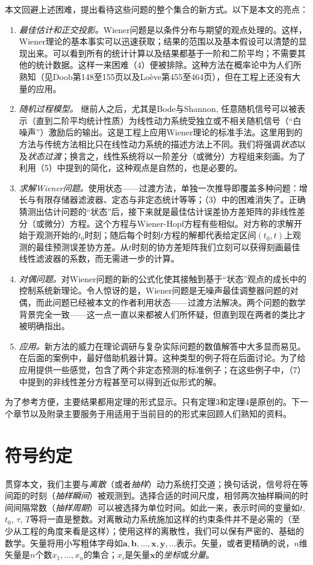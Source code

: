 \documentclass[UTF8,adobefonts]{ctexart}
\begin{document}
本文回避上述困难，提出看待这些问题的整个集合的新方式。以下是本文的亮点：
\begin{enumerate}[resume]
\item \emph{最佳估计和正交投影。}Wiener问题是以条件分布与期望的观点处理的。这样，Wiener理论的基本事实可以迅速获取；结果的范围以及基本假设可以清楚的显现出来。可以看到所有的统计计算以及结果都基于一阶和二阶平均；不需要其他的统计数据。这样一来困难（4）便被排除。这种方法在概率论中为人们所熟知（见Doob\cite{rf15}第148至155页以及Lo\`eve\cite{rf16}第455至464页），但在工程上还没有大量的应用。
\item \emph{随机过程模型。} 继前人之后，尤其是Bode与Shannon\cite{rf3}, 任意随机信号可以被表示（直到二阶平均统计性质）为线性动力系统受独立或不相关随机信号（“白噪声”）激励后的输出。这是工程上应用Wiener理论的标准手法\cite{rf2,rf3,rf4,rf5,rf6,rf7}。这里用到的方法与传统方法相比只在线性动力系统的描述方法上不同。我们将强调\emph{状态}以及\emph{状态过渡}；换言之，线性系统将以一阶差分（或微分）方程组来刻画。为了利用（5）中提到的简化，这种观点是自然的，也是必要的。
\item \emph{求解Wiener问题。}使用状态——过渡方法，单独一次推导即覆盖多种问题：增长与有限存储器滤波器、定态与非定态统计等等；（3）中的困难消失了。正确猜测出估计问题的“状态”后，接下来就是最佳估计误差协方差矩阵的非线性差分（或微分）方程。这个方程与Wiener-Hopf方程有些相似。对方称的求解开始于观测开始的$t_0$时刻；随后每个时刻$t$方程的解都代表给定区间$(t_0, t)$上观测的最佳预测误差协方差。从$t$时刻的协方差矩阵我们立刻可以获得刻画最佳线性滤波器的系数，而无需进一步的计算。
\item \emph{对偶问题。}对Wiener问题的新的公式化使其接触到基于“状态”观点的成长中的控制系统新理论\cite{rf17,rf18,rf19,rf20,rf21,rf22,rf23,rf24}。令人惊讶的是，Wiener问题是无噪声最佳调整器问题的对偶，而此问题已经被本文的作者利用状态——过渡方法解决\cite{rf18,rf23,rf24}。两个问题的数学背景完全一致——这一点一直以来都被人们所怀疑，但直到现在两者的类比才被明确指出。
\item \emph{应用。}新方法的威力在理论调研与复杂实际问题的数值解答中大多显而易见。在后面的案例中，最好借助机器计算。这种类型的例子将在后面讨论。为了给应用提供一些感觉，包含了两个非定态预测的标准例子；在这些例子中，（7）中提到的非线性差分方程甚至可以得到近似形式的解。
\end{enumerate}

为了参考方便，主要结果都用定理的形式显示。只有定理3和定理4是原创的。下一个章节以及附录主要服务于用适用于当前目的的形式来回顾人们熟知的资料。

\section{符号约定}
贯穿本文，我们主要与\emph{离散}（或者\emph{抽样}）动力系统打交道；换句话说，信号将在等间距的时刻（\emph{抽样瞬间}）被观测到。选择合适的时间尺度，相邻两次抽样瞬间的时间间隔常数（\emph{抽样周期}）可以被选择为单位时间。如此一来，表示时间的变量如$t$, $t_0$, $\tau$, $T$等将一直是整数。对离散动力系统施加这样的约束条件并不是必需的（至少从工程的角度来看是这样）；使用这样的离散性，我们可以保有严密的、基础的数学。矢量将用小写粗体字母如$\mathbf{a}, \mathbf{b}, \dotsc, \mathbf{x}, \mathbf{y}, \dotsc$表示。矢量，或者更精确的说，$n$维矢量是$n$个数$x_1, \dotsc, x_n$的集合；$x_i$是矢量$\mathbf{x}$的\emph{坐标}或\emph{分量}。
\end{document}
